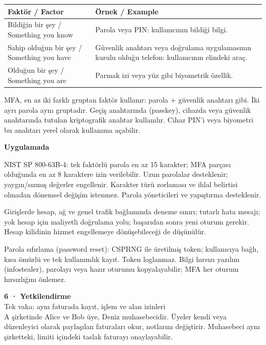 \documentclass[11pt,a4paper]{article}
\newcommand{\AltBaslik}[1]{\par\vspace{3pt}\textbf{#1}\par\nobreak}
\begin{document}
\begingroup\small\begin{tabularx}{\linewidth}{@{}LY@{}}\toprule
Faktör / Factor & Örnek / Example\\\midrule
Bildiğin bir şey / Something you know & Parola veya PIN: kullanıcının bildiği bilgi.\\[2pt]
Sahip olduğun bir şey / Something you have & Güvenlik anahtarı veya doğrulama uygulamasının kurulu olduğu telefon: kullanıcının elindeki araç.\\[2pt]
Olduğun bir şey / Something you are & Parmak izi veya yüz gibi biyometrik özellik.\\[2pt]
\bottomrule\end{tabularx}\endgroup\par
MFA, en az iki farklı gruptan faktör kullanır: parola + güvenlik anahtarı gibi. İki ayrı parola aynı gruptadır. Geçiş anahtarında (passkey), cihazda veya güvenlik anahtarında tutulan kriptografik anahtar kullanılır. Cihaz PIN’i veya biyometri bu anahtarı yerel olarak kullanıma açabilir.

\AltBaslik{Uygulamada}
NIST SP 800-63B-4: tek faktörlü parola en az 15 karakter; MFA parçası olduğunda en az 8 karaktere izin verilebilir. Uzun parolalar desteklenir; yaygın/sızmış değerler engellenir. Karakter türü zorlaması ve ihlal belirtisi olmadan dönemsel değişim istenmez. Parola yöneticileri ve yapıştırma desteklenir.

Girişlerde hesap, ağ ve genel trafik bağlamında deneme sınırı; tutarlı hata mesajı; yok hesap için maliyetli doğrulama yolu; başarıdan sonra yeni oturum gerekir. Hesap kilidinin hizmet engellemeye dönüşebileceği de düşünülür.

Parola sıfırlama (password reset): CSPRNG ile üretilmiş token; kullanıcıya bağlı, kısa ömürlü ve tek kullanımlık kayıt. Token loglanmaz. Bilgi hırsızı yazılım (infostealer), parolayı veya hazır oturumu kopyalayabilir; MFA her oturum hırsızlığını önlemez.


\newpage
{\Large\bfseries 6 · Yetkilendirme}\\[3pt]
{\normalsize Tek vaka: aynı faturada kayıt, işlem ve alan izinleri}\\[5pt]
A şirketinde Alice ve Bob üye, Deniz muhasebecidir. Üyeler kendi veya düzenleyici olarak paylaşılan faturaları okur, notlarını değiştirir. Muhasebeci aynı şirketteki, limiti içindeki taslak faturayı onaylayabilir.
\end{document}
